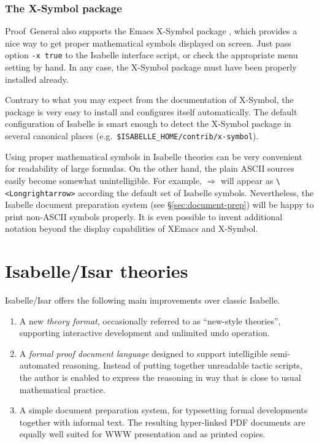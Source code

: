 \subsubsection{The X-Symbol package}

Proof~General also supports the Emacs X-Symbol package \cite{x-symbol}, which
provides a nice way to get proper mathematical symbols displayed on screen.
Just pass option \texttt{-x true} to the Isabelle interface script, or check
the appropriate menu setting by hand.  In any case, the X-Symbol package must
have been properly installed already.

Contrary to what you may expect from the documentation of X-Symbol, the
package is very easy to install and configures itself automatically.  The
default configuration of Isabelle is smart enough to detect the X-Symbol
package in several canonical places (e.g.\ 
\texttt{\$ISABELLE_HOME/contrib/x-symbol}).

\medskip

Using proper mathematical symbols in Isabelle theories can be very convenient
for readability of large formulas.  On the other hand, the plain ASCII sources
easily become somewhat unintelligible.  For example, $\Longrightarrow$ will
appear as \verb,\<Longrightarrow>, according the default set of Isabelle
symbols.  Nevertheless, the Isabelle document preparation system (see
\S\ref{sec:document-prep}) will be happy to print non-ASCII symbols properly.
It is even possible to invent additional notation beyond the display
capabilities of XEmacs and X-Symbol.


\section{Isabelle/Isar theories}

Isabelle/Isar offers the following main improvements over classic Isabelle.
\begin{enumerate}
\item A new \emph{theory format}, occasionally referred to as ``new-style
  theories'', supporting interactive development and unlimited undo operation.
\item A \emph{formal proof document language} designed to support intelligible
  semi-automated reasoning.  Instead of putting together unreadable tactic
  scripts, the author is enabled to express the reasoning in way that is close
  to usual mathematical practice.
\item A simple document preparation system, for typesetting formal
  developments together with informal text.  The resulting hyper-linked PDF
  documents are equally well suited for WWW presentation and as printed
  copies.
\end{enumerate}

